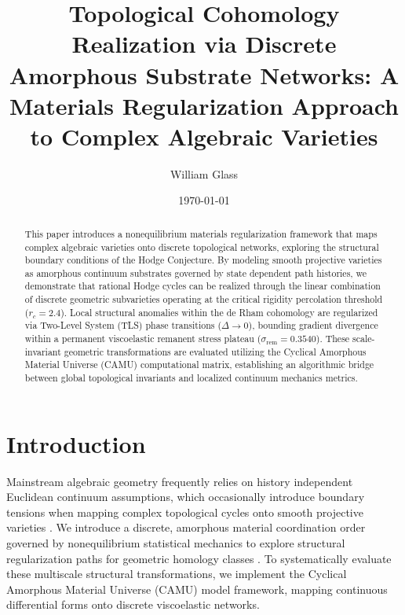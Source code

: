 \documentclass[reprint,amsmath,amssymb,aps,prd,nofootinbib]{revtex4-2}
\begin{document}

\title{Topological Cohomology Realization via Discrete Amorphous Substrate Networks: A Materials Regularization Approach to Complex Algebraic Varieties}

\author{William Glass}

\date{\today}

\begin{abstract}
This paper introduces a nonequilibrium materials regularization framework that maps complex algebraic varieties onto discrete topological networks, exploring the structural boundary conditions of the Hodge Conjecture. By modeling smooth projective varieties as amorphous continuum substrates governed by state dependent path histories, we demonstrate that rational Hodge cycles can be realized through the linear combination of discrete geometric subvarieties operating at the critical rigidity percolation threshold ($r_c = 2.4$). Local structural anomalies within the de Rham cohomology are regularized via Two-Level System (TLS) phase transitions ($\Delta \to 0$), bounding gradient divergence within a permanent viscoelastic remanent stress plateau ($\sigma_{\text{rem}} = 0.3540$). These scale-invariant geometric transformations are evaluated utilizing the Cyclical Amorphous Material Universe (CAMU) computational matrix, establishing an algorithmic bridge between global topological invariants and localized continuum mechanics metrics.
\end{abstract}

\maketitle

\section{Introduction}
Mainstream algebraic geometry frequently relies on history independent Euclidean continuum assumptions, which occasionally introduce boundary tensions when mapping complex topological cycles onto smooth projective varieties \cite{anderson1972}. We introduce a discrete, amorphous material coordination order governed by nonequilibrium statistical mechanics to explore structural regularization paths for geometric homology classes \cite{jaynes1957, martyushev2006}. To systematically evaluate these multiscale structural transformations, we implement the Cyclical Amorphous Material Universe (CAMU) model framework, mapping continuous differential forms onto discrete viscoelastic networks.
\end{document}
